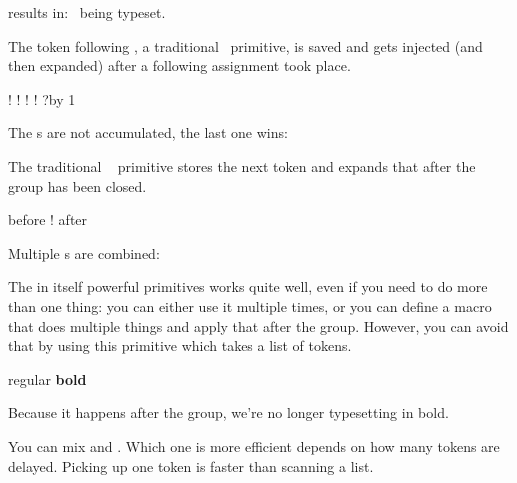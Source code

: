\startbuffer
{}%
%
\stopbuffer

\typebuffer

results in: \inlinebuffer\ being typeset.

\stopnewprimitive

\startoldprimitive[title={\prm {afterassignment}}]

The token following , a traditional \TEX\ primitive, is
saved and gets injected (and then expanded) after a following assignment took
place.

\startbuffer
\afterassignment !\def\MyMacro {}\quad
\afterassignment !\let\MyMacro ?\quad
\afterassignment !\quad
\afterassignment !%
\afterassignment ?\advance\scratchcounter by 1
\stopbuffer

\typebuffer

The s are not accumulated, the last one wins:

{\getbuffer}

\stopoldprimitive

\startoldprimitive[title={\prm {aftergroup}}]

The traditional \TEX\  primitive stores the next token and
expands that after the group has been closed.

\startbuffer
before{ ! \aftergroup a\aftergroup f\aftergroup t\aftergroup e\aftergroup r}
\stopbuffer

Multiple s are combined:

\typebuffer

\getbuffer

\stopoldprimitive

\startnewprimitive[title={\prm {aftergrouped}}]

The in itself powerful  primitives works quite well, even
if you need to do more than one thing: you can either use it multiple times, or
you can define a macro that does multiple things and apply that after the group.
However, you can avoid that by using this primitive which takes a list of tokens.

\startbuffer
regular
\bgroup
{}%
\bf bold
\egroup
\stopbuffer

\typebuffer

Because it happens after the group, we're no longer typesetting in bold.

{\getbuffer}

You can mix  and . Which one is more
efficient depends on how many tokens are delayed. Picking up one token is faster
than scanning a list.

